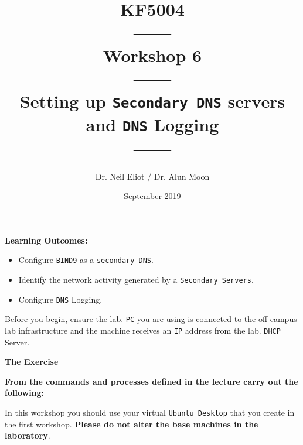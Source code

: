 \documentclass[11pt]{article}
\begin{document}
\author{Dr. Neil Eliot / Dr. Alun Moon}
\title{KF5004\\------\\Workshop 6\\------\\Setting up \texttt{Secondary DNS} servers and \texttt{DNS} Logging\\------}
\date{September 2019}
\maketitle

\newpage



\noindent\textbf{Learning Outcomes:}
\begin{itemize}
    \item Configure \texttt{BIND9} as a \texttt{secondary DNS}.
    \item Identify the network activity generated by a \texttt{Secondary Servers}.
    \item Configure \texttt{DNS} Logging.
\end{itemize}


\begin{tcolorbox}[title={\textbf{Important:}}]
    Before you begin, ensure the lab. \texttt{PC} you are using is connected to the off campus lab infrastructure and the machine receives an \texttt{IP} address from the lab. \texttt{DHCP} Server.
\end{tcolorbox}
\newpage

\noindent\textbf{The Exercise}\\
\begin{tcolorbox}[colback=blue!20]
    \noindent\textbf{From the commands and processes defined in the lecture carry out the following:}
\end{tcolorbox}


\begin{tcolorbox}[title={\textbf{NOTE:}}]
    In this workshop you should use your virtual \texttt{Ubuntu Desktop} that you create in the first workshop. \textbf{Please do not alter the base machines in the laboratory}.
\end{tcolorbox}
\end{document}
